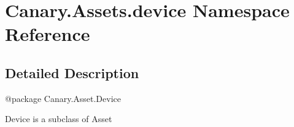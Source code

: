 \hypertarget{namespace_canary_1_1_assets_1_1device}{\section{Canary.\-Assets.\-device Namespace Reference}
\label{namespace_canary_1_1_assets_1_1device}
}


\subsection{Detailed Description}
\begin{DoxyVerb}@package Canary.Asset.Device

Device is a subclass of Asset
\end{DoxyVerb}
 